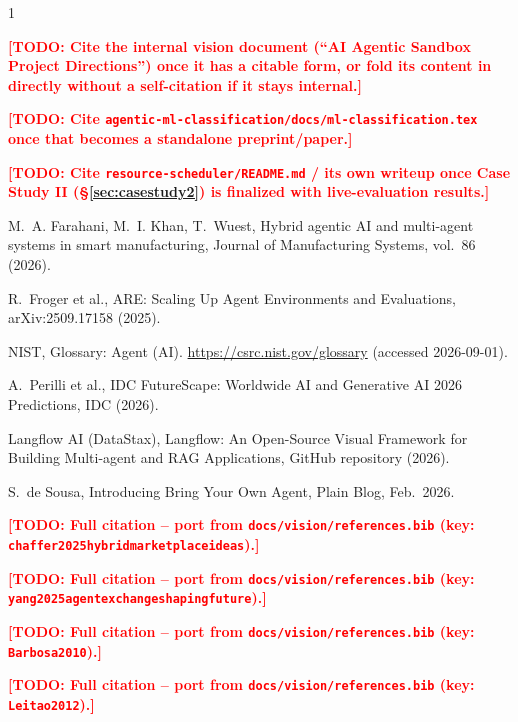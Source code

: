\documentclass[10pt,conference]{IEEEtran}
\newcommand{\todo}[1]{\textcolor{red}{\textbf{[TODO: #1]}}}
\begin{document}

\begin{thebibliography}{1}

\todo{Cite the internal vision document (``AI Agentic Sandbox Project
Directions'') once it has a citable form, or fold its content in directly
without a self-citation if it stays internal.}

\todo{Cite \texttt{agentic-ml-classification/docs/ml-classification.tex}
once that becomes a standalone preprint/paper.}

\todo{Cite \texttt{resource-scheduler/README.md} / its own writeup once
Case Study II (\S\ref{sec:casestudy2}) is finalized with live-evaluation
results.}

M.~A. Farahani, M.~I. Khan, T.~Wuest, Hybrid agentic AI and multi-agent
systems in smart manufacturing, Journal of Manufacturing Systems, vol.~86
(2026).

R.~Froger et al., ARE: Scaling Up Agent Environments and Evaluations,
arXiv:2509.17158 (2025).

NIST, Glossary: Agent (AI). \url{https://csrc.nist.gov/glossary} (accessed
2026-09-01).

A.~Perilli et al., IDC FutureScape: Worldwide AI and Generative AI 2026
Predictions, IDC (2026).

Langflow AI (DataStax), Langflow: An Open-Source Visual Framework for
Building Multi-agent and RAG Applications, GitHub repository (2026).

S.~de Sousa, Introducing Bring Your Own Agent, Plain Blog, Feb.\ 2026.

\todo{Full citation -- port from \texttt{docs/vision/references.bib}
(key: \texttt{chaffer2025hybridmarketplaceideas}).}

\todo{Full citation -- port from \texttt{docs/vision/references.bib}
(key: \texttt{yang2025agentexchangeshapingfuture}).}

\todo{Full citation -- port from \texttt{docs/vision/references.bib}
(key: \texttt{Barbosa2010}).}

\todo{Full citation -- port from \texttt{docs/vision/references.bib}
(key: \texttt{Leitao2012}).}


\end{thebibliography}
\end{document}

